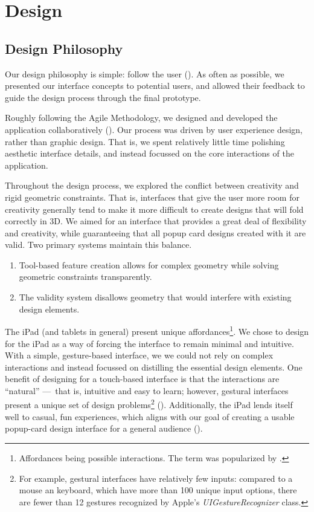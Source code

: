 \chapter{Design}

\section{Design Philosophy}\label{design-philosophy}

Our design philosophy is simple: follow the user
(\citet{bell2008design}). As often as possible, we presented our
interface concepts to potential users, and allowed their feedback to
guide the design process through the final prototype.

Roughly following the Agile Methodology, we designed and developed the
application collaboratively (\citet{martin2003agile}). Our process was
driven by user experience design, rather than graphic design. That is,
we spent relatively little time polishing aesthetic interface details,
and instead focussed on the core interactions of the application.

Throughout the design process, we explored the conflict between
creativity and rigid geometric constraints. That is, interfaces that
give the user more room for creativity generally tend to make it more
difficult to create designs that will fold correctly in 3D. We aimed for
an interface that provides a great deal of flexibility and creativity,
while guaranteeing that all popup card designs created with it are
valid. Two primary systems maintain this balance.

\begin{enumerate}
\def\labelenumi{\arabic{enumi})}
\itemsep1pt\parskip0pt
\item
  Tool-based feature creation allows for complex geometry while solving
  geometric constraints transparently.
\item
  The validity system disallows geometry that would interfere with
  existing design elements.
\end{enumerate}

The iPad (and tablets in general) present unique affordances\footnote{Affordances
  being possible interactions. The term was popularized by
  \citet{norman2013design}.}. We chose to design for the iPad as a way
of forcing the interface to remain minimal and intuitive. With a simple,
gesture-based interface, we we could not rely on complex interactions
and instead focussed on distilling the essential design elements. One
benefit of designing for a touch-based interface is that the
interactions are ``natural'' ---~that is, intuitive and easy to learn;
however, gestural interfaces present a unique set of design
problems\footnote{For example, gestural interfaces have relatively few
  inputs: compared to a mouse an keyboard, which have more than 100
  unique input options, there are fewer than 12 gestures recognized by
  Apple's \emph{UIGestureRecognizer} class.}
(\citet{norman2010gestural}). Additionally, the iPad lends itself well
to casual, fun experiences, which aligns with our goal of creating a
usable popup-card design interface for a general audience
(\citet{johansen2013ipad}).

